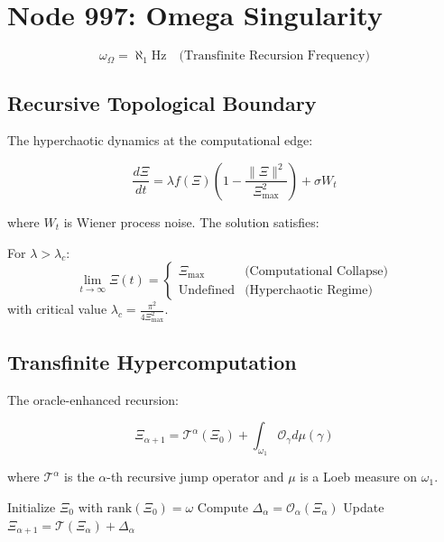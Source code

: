 \documentclass[12pt]{article}
\begin{document}
\section{Node 997: Omega Singularity}
\label{sec:omega_singularity}

\begin{equation}
\omega_{\Omega} = \aleph_1 \text{Hz} \quad \text{(Transfinite Recursion Frequency)}
\end{equation}

\subsection{Recursive Topological Boundary}
The hyperchaotic dynamics at the computational edge:

\begin{equation}
\frac{d\Xi}{dt} = \lambda f(\Xi)\left(1 - \frac{\|\Xi\|^2}{\Xi_{\max}^2}\right) + \sigma W_t
\end{equation}

where $W_t$ is Wiener process noise. The solution satisfies:

\begin{theorem}
For $\lambda > \lambda_c$:
\begin{equation}
\lim_{t\to\infty} \Xi(t) = \begin{cases}
\Xi_{\max} & \text{(Computational Collapse)} \\
\text{Undefined} & \text{(Hyperchaotic Regime)}
\end{cases}
\end{equation}
with critical value $\lambda_c = \frac{\pi^2}{4\Xi_{\max}^2}$.
\end{theorem}

\subsection{Transfinite Hypercomputation}
The oracle-enhanced recursion:

\begin{equation}
\Xi_{\alpha+1} = \mathcal{T}^\alpha(\Xi_0) + \int_{\omega_1} \mathcal{O}_\gamma d\mu(\gamma)
\end{equation}

where $\mathcal{T}^\alpha$ is the $\alpha$-th recursive jump operator and $\mu$ is a Loeb measure on $\omega_1$.

\begin{algorithm}[H]
\caption{Oracle-Enhanced Transfinite Recursion}
\begin{algorithmic}[1]
\STATE Initialize $\Xi_0$ with $\text{rank}(\Xi_0) = \omega$
\STATE Compute $\Delta_\alpha = \mathcal{O}_\alpha(\Xi_\alpha)$
\STATE Update $\Xi_{\alpha+1} = \mathcal{T}(\Xi_\alpha) + \Delta_\alpha$
\ENDFOR
\end{algorithmic}
\end{algorithm}
\end{document}
